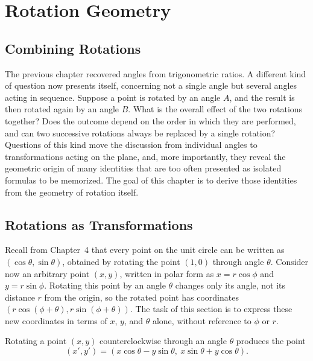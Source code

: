 \chapter{Rotation Geometry}
\label{ch:ch08-rotation-geometry}

\section{Combining Rotations}

The previous chapter recovered angles from trigonometric ratios. A
different kind of question now presents itself, concerning not a single
angle but several angles acting in sequence. Suppose a point is rotated by
an angle $A$, and the result is then rotated again by an angle $B$. What is
the overall effect of the two rotations together? Does the outcome depend
on the order in which they are performed, and can two successive rotations
always be replaced by a single rotation? Questions of this kind move the
discussion from individual angles to transformations acting on the plane,
and, more importantly, they reveal the geometric origin of many identities
that are too often presented as isolated formulas to be memorized. The goal
of this chapter is to derive those identities from the geometry of rotation
itself.

\section{Rotations as Transformations}

Recall from Chapter~4 that every point on the unit circle can be written as
$(\cos\theta, \sin\theta)$, obtained by rotating the point $(1,0)$ through
angle $\theta$. Consider now an arbitrary point $(x,y)$, written in polar
form as $x = r\cos\phi$ and $y = r\sin\phi$. Rotating this point by an
angle $\theta$ changes only its angle, not its distance $r$ from the
origin, so the rotated point has coordinates $(r\cos(\phi+\theta),
r\sin(\phi+\theta))$. The task of this section is to express these new
coordinates in terms of $x$, $y$, and $\theta$ alone, without reference to
$\phi$ or $r$.

\begin{theorem}
Rotating a point $(x,y)$ counterclockwise through an angle $\theta$
produces the point
\[
(x',y') = (x\cos\theta - y\sin\theta,\ x\sin\theta + y\cos\theta).
\]
\end{theorem}

